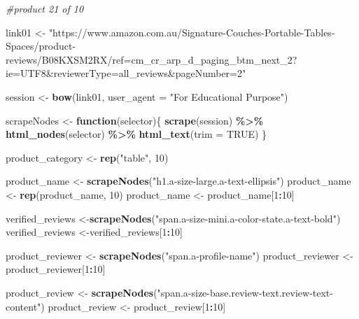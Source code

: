 \documentclass[
]{article}
\newenvironment{Shaded}{\begin{snugshade}}{\end{snugshade}}
\newcommand{\AttributeTok}[1]{\textcolor[rgb]{0.13,0.29,0.53}{#1}}
\newcommand{\CommentTok}[1]{\textcolor[rgb]{0.56,0.35,0.01}{\textit{#1}}}
\newcommand{\ConstantTok}[1]{\textcolor[rgb]{0.56,0.35,0.01}{#1}}
\newcommand{\ControlFlowTok}[1]{\textcolor[rgb]{0.13,0.29,0.53}{\textbf{#1}}}
\newcommand{\DecValTok}[1]{\textcolor[rgb]{0.00,0.00,0.81}{#1}}
\newcommand{\FunctionTok}[1]{\textcolor[rgb]{0.13,0.29,0.53}{\textbf{#1}}}
\newcommand{\NormalTok}[1]{#1}
\newcommand{\OtherTok}[1]{\textcolor[rgb]{0.56,0.35,0.01}{#1}}
\newcommand{\SpecialCharTok}[1]{\textcolor[rgb]{0.81,0.36,0.00}{\textbf{#1}}}
\newcommand{\StringTok}[1]{\textcolor[rgb]{0.31,0.60,0.02}{#1}}
\begin{document}
\begin{Shaded}
\begin{Highlighting}[]
\CommentTok{\#product 21 of 10}

\NormalTok{link01 }\OtherTok{\textless{}{-}} \StringTok{"https://www.amazon.com.au/Signature{-}Couches{-}Portable{-}Tables{-}Spaces/product{-}reviews/B08KXSM2RX/ref=cm\_cr\_arp\_d\_paging\_btm\_next\_2?ie=UTF8\&reviewerType=all\_reviews\&pageNumber=2"}


\NormalTok{  session }\OtherTok{\textless{}{-}} \FunctionTok{bow}\NormalTok{(link01,}
               \AttributeTok{user\_agent =} \StringTok{"For Educational Purpose"}\NormalTok{)}

\NormalTok{  scrapeNodes }\OtherTok{\textless{}{-}} \ControlFlowTok{function}\NormalTok{(selector)\{}
    \FunctionTok{scrape}\NormalTok{(session) }\SpecialCharTok{\%\textgreater{}\%}
      \FunctionTok{html\_nodes}\NormalTok{(selector) }\SpecialCharTok{\%\textgreater{}\%}
      \FunctionTok{html\_text}\NormalTok{(}\AttributeTok{trim =} \ConstantTok{TRUE}\NormalTok{)}
\NormalTok{  \}}

\NormalTok{  product\_category }\OtherTok{\textless{}{-}} \FunctionTok{rep}\NormalTok{(}\StringTok{"table"}\NormalTok{, }\DecValTok{10}\NormalTok{)}

\NormalTok{  product\_name }\OtherTok{\textless{}{-}} \FunctionTok{scrapeNodes}\NormalTok{(}\StringTok{"h1.a{-}size{-}large.a{-}text{-}ellipsis"}\NormalTok{)}
\NormalTok{  product\_name }\OtherTok{\textless{}{-}} \FunctionTok{rep}\NormalTok{(product\_name, }\DecValTok{10}\NormalTok{)}
\NormalTok{  product\_name }\OtherTok{\textless{}{-}}\NormalTok{ product\_name[}\DecValTok{1}\SpecialCharTok{:}\DecValTok{10}\NormalTok{]}
  
\NormalTok{  verified\_reviews }\OtherTok{\textless{}{-}}\FunctionTok{scrapeNodes}\NormalTok{(}\StringTok{"span.a{-}size{-}mini.a{-}color{-}state.a{-}text{-}bold"}\NormalTok{)}
\NormalTok{  verified\_reviews }\OtherTok{\textless{}{-}}\NormalTok{verified\_reviews[}\DecValTok{1}\SpecialCharTok{:}\DecValTok{10}\NormalTok{]}
  
\NormalTok{  product\_reviewer }\OtherTok{\textless{}{-}} \FunctionTok{scrapeNodes}\NormalTok{(}\StringTok{"span.a{-}profile{-}name"}\NormalTok{)}
\NormalTok{  product\_reviewer }\OtherTok{\textless{}{-}}\NormalTok{ product\_reviewer[}\DecValTok{1}\SpecialCharTok{:}\DecValTok{10}\NormalTok{]}
  
\NormalTok{  product\_review }\OtherTok{\textless{}{-}} \FunctionTok{scrapeNodes}\NormalTok{(}\StringTok{"span.a{-}size{-}base.review{-}text.review{-}text{-}content"}\NormalTok{)}
\NormalTok{  product\_review }\OtherTok{\textless{}{-}}\NormalTok{ product\_review[}\DecValTok{1}\SpecialCharTok{:}\DecValTok{10}\NormalTok{]}
  

\end{Highlighting}
\end{Shaded}
\end{document}
